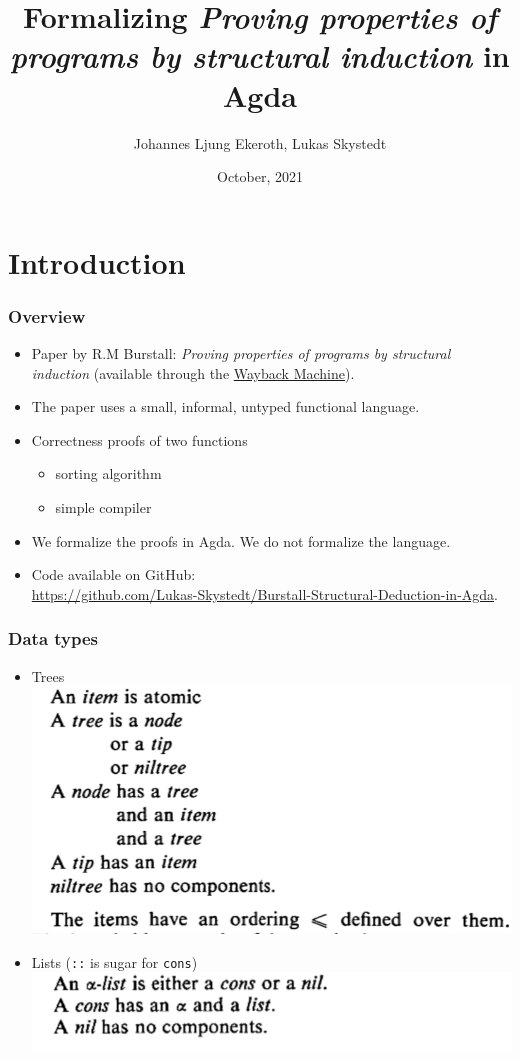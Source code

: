 \documentclass{beamer}
\title{Formalizing \textit{Proving properties of programs by structural induction} in Agda}
\author{Johannes Ljung Ekeroth, Lukas Skystedt}
\date{October, 2021}
\newcommand{\code}[1]{\texttt{#1}}
\begin{document}
\beamertemplatenavigationsymbolsempty %
\section{Introduction}
\frame{\titlepage}
\begin{frame}[fragile]
  \frametitle{Overview}
  \begin{itemize}
  \item Paper by R.M Burstall: \textit{Proving properties of programs by structural induction} (available through the \href{https://web.archive.org/web/20201112001546/https://www.cse.chalmers.se/edu/year/2010/course/DAT140_Types/Burstall.pdf}{Wayback Machine}).
  \item    The paper uses a small, informal, untyped functional language.
  \item Correctness proofs of two functions
    \begin{itemize}
    \item sorting algorithm
    \item simple compiler
    \end{itemize} 
    \pause
  \item We formalize the proofs in Agda. We do not formalize the language.
  \item Code available on GitHub:\\ \small \url{https://github.com/Lukas-Skystedt/Burstall-Structural-Deduction-in-Agda}.
  \end{itemize}
\end{frame}

\begin{frame}
  \frametitle{Data types}
  \begin{itemize}
  \item Trees\\
    \includegraphics[width=.6\textwidth]{./tree.png}
  \item Lists (\code{::} is sugar for \code{cons})\\
    \includegraphics[width=.6\textwidth]{./list.png}
  \end{itemize}
\end{frame} 
\end{document}

